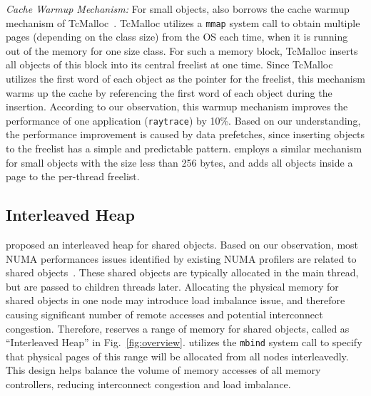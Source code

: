 \textit{Cache Warmup Mechanism:} For small objects, \NM{} also borrows the cache warmup mechanism of TcMalloc~\cite{tcmalloc}. TcMalloc utilizes a \texttt{mmap} system call to obtain multiple pages (depending on the class size) from the OS each time, when it is running out of the memory for one size class. For such a memory block, TcMalloc inserts all objects of this block into its central freelist at one time. Since TcMalloc utilizes the first word of each object as the pointer for the freelist, this mechanism warms up the cache by referencing the first word of each object during the insertion. According to our observation, this warmup mechanism improves the performance of one application (\texttt{raytrace}) by 10\%. Based on our understanding, the performance improvement is caused by data prefetches, since inserting objects to the freelist has a simple and predictable pattern. \NM{} employs a similar mechanism for small objects with the size less than 256 bytes, and adds all objects inside a page to the per-thread freelist. 

\subsection{Interleaved Heap} 
\label{sec:mainthread}

\NA{} proposed an interleaved heap for shared objects. Based on our observation, most NUMA performances issues identified by existing NUMA profilers are related to shared objects~\cite{XULIU, MemProf}. These shared objects are typically allocated in the main thread, but are passed to children threads later. Allocating the physical memory for shared objects in one node may introduce load imbalance issue, and therefore causing significant number of remote accesses and potential interconnect congestion. Therefore, \NA{} reserves a range of memory for shared objects, called as ``Interleaved Heap'' in Fig.~\ref{fig:overview}. \NA{} utilizes the \texttt{mbind} system call to specify that  physical pages of this range will be allocated from all nodes interleavedly. This design helps balance the volume of memory accesses of all memory controllers, reducing interconnect congestion and load imbalance. 

 
